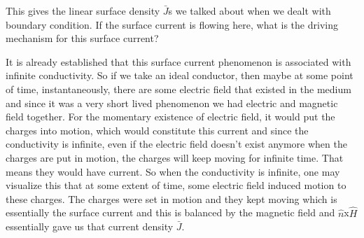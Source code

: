 This gives the linear surface density $\bar{J}$s we talked about when we dealt with boundary condition. If the surface current is flowing here, what is the driving mechanism for this surface current?

It is already established that this surface current phenomenon is associated with infinite conductivity. So if we take an ideal conductor, then maybe at some point of time, instantaneously, there are some electric field that existed in the medium and since it was a very short lived phenomenon we had electric and magnetic field together.
For the momentary existence of electric field, it would put the charges into motion, which would constitute this current and since the conductivity is infinite, even if the electric field doesn't exist anymore when the charges are put in motion, the charges will keep moving for infinite time. That means they would have current. So when the conductivity is infinite, one may visualize this that at some extent of time, some electric field induced motion to these charges. The charges were set in motion and they kept moving which is essentially the surface current and this is balanced by the magnetic field and $\hat{n}$x$\hat{H}$ essentially gave us that current density $\bar{J}$.

